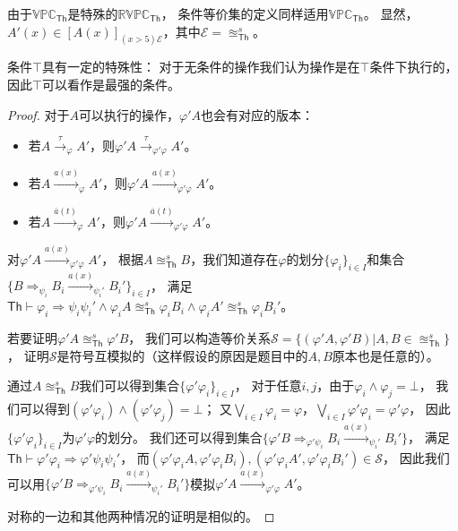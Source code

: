    由于$\mathbb{VPC}_{\mathsf{Th}}$是特殊的$\mathbb{RVPC}_{\mathsf{Th}}$，
   条件等价集的定义同样适用$\mathbb{VPC}_{\mathsf{Th}}$。
   显然，$A'(x)\in [A(x)]_{(x>5)\mathcal{E}}$，其中$\mathcal{E}=\approxeq_{\mathsf{Th}}^s$。
   
   条件$\top$具有一定的特殊性：
   对于无条件的操作我们认为操作是在$\top$条件下执行的，
   因此$\top$可以看作是最强的条件。

   \begin{proof}
      对于$A$可以执行的操作，$\varphi' A$也会有对应的版本：
      \begin{itemize}
         \item 若$A\stackrel{\tau}{\rightarrow}_{\varphi} A'$，则$\varphi' A\stackrel{\tau}{\rightarrow}_{\varphi' \varphi}A'$。
         \item 若$A\stackrel{a(x)}{\rightarrow}_{\varphi} A'$，则$\varphi' A\stackrel{a(x)}{\rightarrow}_{\varphi' \varphi} A'$。
         \item 若$A\stackrel{\overline{a}(t)}{\rightarrow}_{\varphi} A'$，则$\varphi' A\stackrel{\overline{a}(t)}{\rightarrow}_{\varphi' \varphi} A'$。
      \end{itemize}
      对$\varphi' A\stackrel{a(x)}{\rightarrow}_{\varphi'\varphi} A'$，
      根据$A\approxeq_{\mathsf{Th}}^sB$，我们知道存在$\varphi$的划分$\{\varphi_i\}_{i\in I}$和集合$\{B\Rightarrow_{\psi_i}B_i\stackrel{a(x)}{\rightarrow}_{\psi_i'}B_i'\}_{i\in I}$，
      满足$\mathsf{Th}\vdash \varphi_i\Rightarrow \psi_i \psi_i' \wedge \varphi_i A\approxeq_{\mathsf{Th}}^s \varphi_i B_i \wedge \varphi_i A'\approxeq_{\mathsf{Th}}^s \varphi_i B_i'$。
      
      若要证明$\varphi' A\approxeq_{\mathsf{Th}}^s\varphi' B$，
      我们可以构造等价关系$\mathcal{S} = \{(\varphi'A,\varphi'B)|A,B\in \approxeq_{\mathsf{Th}}^s\}$，
      证明$\mathcal{S}$是符号互模拟的（这样假设的原因是题目中的$A,B$原本也是任意的）。

      通过$A\approxeq_{\mathsf{Th}}^sB$我们可以得到集合$\{\varphi'\varphi_i\}_{i\in I}$，
      对于任意$i,j$，由于$\varphi_i \wedge \varphi_j = \bot$，
      我们可以得到$(\varphi'\varphi_i) \wedge (\varphi'\varphi_j) = \bot$；
      又$\bigvee_{i\in I}\varphi_i = \varphi$，$\bigvee_{i\in I}\varphi'\varphi_i = \varphi'\varphi$，
      因此$\{\varphi'\varphi_i\}_{i\in I}$为$\varphi'\varphi$的划分。
      我们还可以得到集合$\{\varphi'B\Rightarrow_{\varphi'\psi_i}B_i\stackrel{a(x)}{\rightarrow}_{\psi_i'} B_i'\}$，
      满足$\mathsf{Th}\vdash \varphi'\varphi_i\Rightarrow \varphi'\psi_i\psi_i'$，
      而$(\varphi'\varphi_i A, \varphi'\varphi_i B_i),(\varphi'\varphi_i A', \varphi'\varphi_i B_i')\in \mathcal{S}$，
      因此我们可以用$\{\varphi'B\Rightarrow_{\varphi'\psi_i}B_i\stackrel{a(x)}{\rightarrow}_{\psi_i'} B_i'\}$模拟$\varphi' A\stackrel{a(x)}{\rightarrow}_{\varphi'\varphi} A'$。

      对称的一边和其他两种情况的证明是相似的。
   \end{proof}

